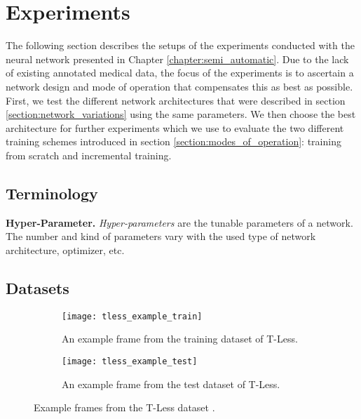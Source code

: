 \chapter{Experiments} \label{chapter:experiments}

The following section describes the setups of the experiments conducted with the neural network presented in Chapter \ref{chapter:semi_automatic}. Due to the lack of existing annotated medical data, the focus of the experiments is to ascertain a network design and mode of operation that compensates this as best as possible. First, we test the different network architectures that were described in section \ref{section:network_variations} using the same parameters. We then choose the best architecture for further experiments which we use to evaluate the two different training schemes introduced in section \ref{section:modes_of_operation}: training from scratch and incremental training.

\section{Terminology}

\noindent\textbf{Hyper-Parameter.} \textit{Hyper-parameters} are the tunable parameters of a network. The number and kind of parameters vary with the used type of network architecture, optimizer, etc.

\section{Datasets} \label{section:experiments_datasets}

\begin{figure}[!tbp]
	\centering
	\begin{subfigure}[t]{0.47\textwidth}
		\centering
    	\texttt{[image: tless\_example\_train]}
    	\caption{An example frame from the training dataset of T-Less.}
    	\label{fig:tless_example_train}
	\end{subfigure}
	\hfill
	\begin{subfigure}[t]{0.47\textwidth}
		\centering
    	\texttt{[image: tless\_example\_test]}
    	\caption{An example frame from the test dataset of T-Less.}
    	\label{fig:tless_example_test}
	\end{subfigure}
	\caption{Example frames from the T-Less dataset \cite{tless}.}
	\label{fig:tless_examples}
\end{figure}

